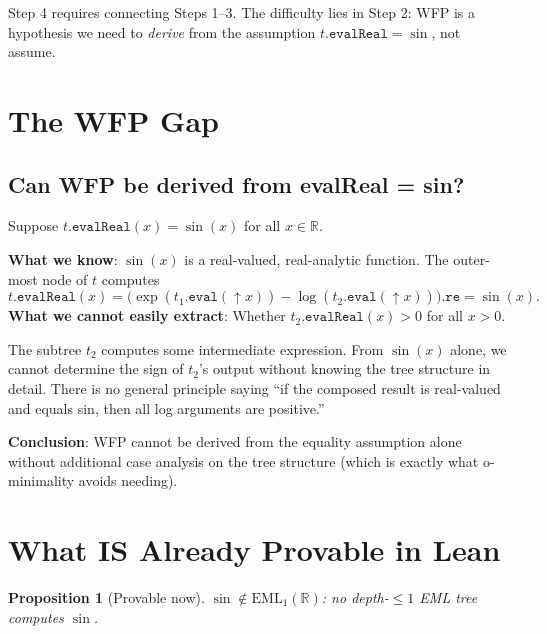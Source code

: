 \documentclass[12pt]{article}
\newtheorem{proposition}[theorem]{Proposition}
\begin{document}
Step 4 requires connecting Steps 1--3. The difficulty lies in Step 2: WFP
is a hypothesis we need to \emph{derive} from the assumption
$t.\mathtt{evalReal} = \sin$, not assume.

\section{The WFP Gap}

\subsection{Can WFP be derived from evalReal = sin?}

Suppose $t.\mathtt{evalReal}(x) = \sin(x)$ for all $x \in \mathbb{R}$.

\textbf{What we know}: $\sin(x)$ is a real-valued, real-analytic function.
The outer-most node of $t$ computes
\[
  t.\mathtt{evalReal}(x) = \bigl(\exp(t_1.\mathtt{eval}(\uparrow\!x)) -
  \log(t_2.\mathtt{eval}(\uparrow\!x))\bigr).\mathtt{re} = \sin(x).
\]
\textbf{What we cannot easily extract}: Whether $t_2.\mathtt{evalReal}(x) > 0$ for all $x > 0$.

The subtree $t_2$ computes some intermediate expression. From $\sin(x)$ alone, we
cannot determine the sign of $t_2$'s output without knowing the tree structure in detail.
There is no general principle saying ``if the composed result is real-valued and
equals sin, then all log arguments are positive.''

\textbf{Conclusion}: WFP cannot be derived from the equality assumption alone without
additional case analysis on the tree structure (which is exactly what o-minimality
avoids needing).

\section{What IS Already Provable in Lean}

\begin{proposition}[\textcolor{proved}{Provable now}]\label{prop:depth1}
$\sin \notin \mathrm{EML}_1(\mathbb{R})$: no depth-$\leq 1$ EML tree computes $\sin$.
\end{proposition}
\end{document}
